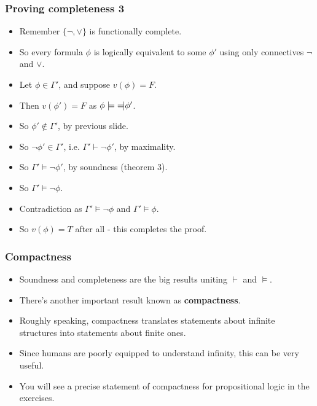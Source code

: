 \documentclass[handout]{beamer}
\newcommand{\lequiv}{\models\text{\reflectbox{$\models$}}}
\begin{document}
\begin{frame}
\frametitle{Proving completeness 3}
\begin{itemize}
\item Remember $\{\neg,\vee\}$ is functionally complete.
\item So every formula $\phi$ is logically equivalent to some $\phi'$ using only connectives $\neg$ and $\vee$.
\item Let $\phi\in\Gamma'$, and suppose $v(\phi)=F$.
\item Then $v(\phi')=F$ as $\phi\lequiv \phi'$.
\item So $\phi'\notin \Gamma'$, by previous slide.
\item So $\neg\phi'\in\Gamma'$, i.e. $\Gamma'\vdash \neg\phi'$, by maximality.
\item So $\Gamma'\models \neg\phi'$, by soundness (theorem 3).
\item So $\Gamma'\models \neg\phi$.
\item Contradiction as $\Gamma'\models \neg\phi$ and $\Gamma'\models \phi$.
\item So $v(\phi)=T$ after all - this completes the proof.
\end{itemize}

\end{frame}

\begin{frame}
\frametitle{Compactness}
\begin{itemize}
\item Soundness and completeness are the big results uniting $\vdash$ and $\models$.
\vspace{.3cm}
\item There's another important result known as \textbf{compactness}.
\vspace{.3cm}
\item Roughly speaking, compactness translates statements about infinite structures into statements about finite ones.
\vspace{.3cm}
\item Since humans are poorly equipped to understand infinity, this can be very useful.
\vspace{.3cm}
\item You will see a precise statement of compactness for propositional logic in the exercises. 
\end{itemize}

\end{frame}
\end{document}
